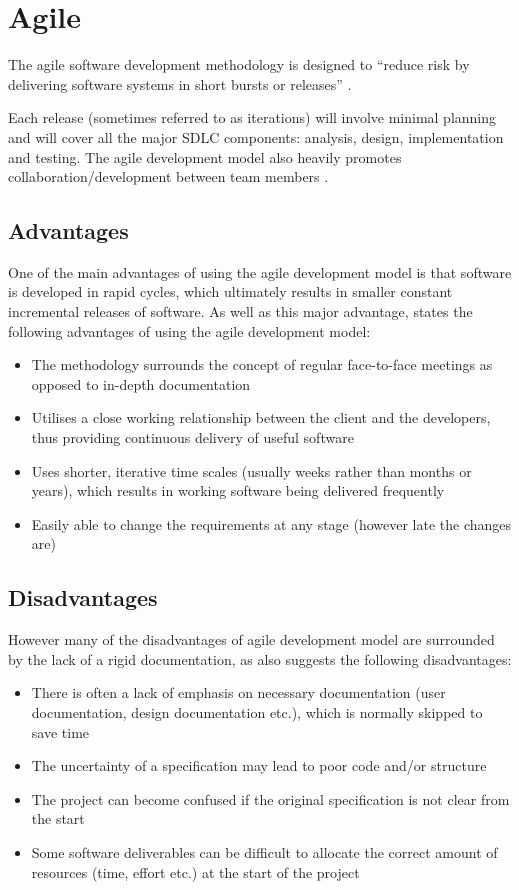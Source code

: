 \section{Agile}
The agile software development methodology is designed to ``reduce risk by 
delivering software systems in short bursts or releases'' \citep{dawson09}.

Each release (sometimes referred to as iterations) will involve minimal 
planning and will cover all the major SDLC components: analysis, design, 
implementation and testing. The agile development model also heavily promotes 
collaboration/development between team members \citep{dawson09}. 


\subsection{Advantages}
One of the main advantages of using the agile development model is that 
software is developed in rapid cycles, which ultimately results in smaller 
constant incremental releases of software. As well as this major advantage, 
\citet{dawson09} states the following advantages of using the agile development 
model:

\begin{itemize}
  \item The methodology surrounds the concept of regular face-to-face meetings 
  as opposed to in-depth documentation
  \item Utilises a close working relationship between the client and the 
  developers, thus providing continuous delivery of useful software
  \item Uses shorter, iterative time scales (usually weeks rather than months 
  or years), which results in working software being delivered frequently
  \item Easily able to change the requirements at any stage (however late the 
  changes are)
\end{itemize}


\subsection{Disadvantages}
However many of the disadvantages of agile development model are surrounded by 
the lack of a rigid documentation, as \citet{dawson09} also suggests the following 
disadvantages:

\begin{itemize}
  \item There is often a lack of emphasis on necessary documentation (user 
  documentation, design documentation etc.), which is normally skipped to save 
  time
  \item The uncertainty of a specification may lead to poor code and/or 
  structure
  \item The project can become confused if the original specification is not 
  clear from the start
  \item Some software deliverables can be difficult to allocate the correct 
  amount of resources (time, effort etc.) at the start of the project
\end{itemize}
